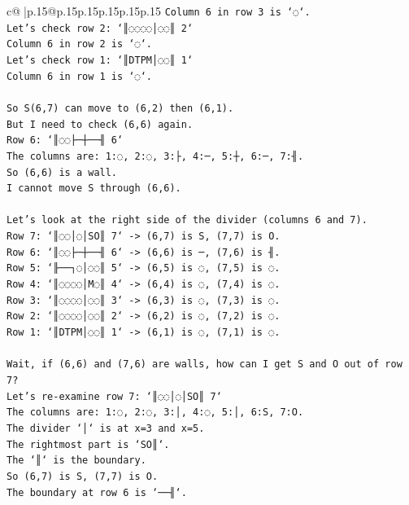 \documentclass{article}
\begin{document}
{\begin{supertabular}{c@{$\;$}|p{.15\linewidth}@{}p{.15\linewidth}p{.15\linewidth}p{.15\linewidth}p{.15\linewidth}p{.15\linewidth}}
{{{\texttt{Column 6 in row 3 is `◌`.} \\
\texttt{Let's check row 2: `║◌◌◌◌│◌◌║ 2`} \\
\texttt{Column 6 in row 2 is `◌`.} \\
\texttt{Let's check row 1: `║DTPM│◌◌║ 1`} \\
\texttt{Column 6 in row 1 is `◌`.} \\
\\ 
\texttt{So S(6,7) can move to (6,2) then (6,1).} \\
\texttt{But I need to check (6,6) again.} \\
\texttt{Row 6: `║◌◌├─┼──╢ 6`} \\
\texttt{The columns are: 1:◌, 2:◌, 3:├, 4:─, 5:┼, 6:─, 7:╢.} \\
\texttt{So (6,6) is a wall.} \\
\texttt{I cannot move S through (6,6).} \\
\\ 
\texttt{Let's look at the right side of the divider (columns 6 and 7).} \\
\texttt{Row 7: `║◌◌│◌│SO║ 7` {-}> (6,7) is S, (7,7) is O.} \\
\texttt{Row 6: `║◌◌├─┼──╢ 6` {-}> (6,6) is ─, (7,6) is ╢.} \\
\texttt{Row 5: `╟──┐◌│◌◌║ 5` {-}> (6,5) is ◌, (7,5) is ◌.} \\
\texttt{Row 4: `║◌◌◌◌│M◌║ 4` {-}> (6,4) is ◌, (7,4) is ◌.} \\
\texttt{Row 3: `║◌◌◌◌│◌◌║ 3` {-}> (6,3) is ◌, (7,3) is ◌.} \\
\texttt{Row 2: `║◌◌◌◌│◌◌║ 2` {-}> (6,2) is ◌, (7,2) is ◌.} \\
\texttt{Row 1: `║DTPM│◌◌║ 1` {-}> (6,1) is ◌, (7,1) is ◌.} \\
\\ 
\texttt{Wait, if (6,6) and (7,6) are walls, how can I get S and O out of row 7?} \\
\texttt{Let's re{-}examine row 7: `║◌◌│◌│SO║ 7`} \\
\texttt{The columns are: 1:◌, 2:◌, 3:│, 4:◌, 5:│, 6:S, 7:O.} \\
\texttt{The divider `│` is at x=3 and x=5.} \\
\texttt{The rightmost part is `SO║`.} \\
\texttt{The `║` is the boundary.} \\
\texttt{So (6,7) is S, (7,7) is O.} \\
\texttt{The boundary at row 6 is `──╢`.} \\
}}}
\end{supertabular}}
\end{document}
